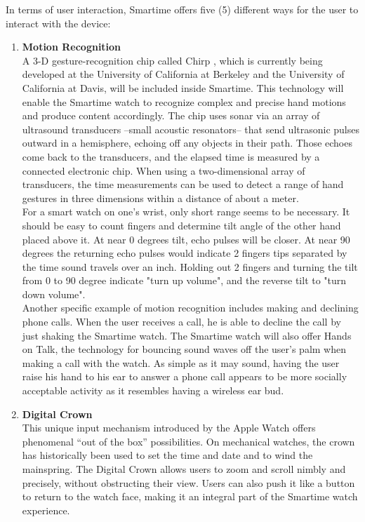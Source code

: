 \documentclass{article}
\begin{document}
In terms of user interaction, Smartime offers five (5) different ways for the user to interact with the device: 

\begin{enumerate}
\item \textbf{Motion Recognition}\\
A 3-D gesture-recognition chip called Chirp , which is currently being developed at the University of California at Berkeley and the University of California at Davis, will be included inside Smartime. This technology will enable the Smartime watch to recognize complex and precise hand motions and produce content accordingly. The chip uses sonar via an array of ultrasound transducers --small acoustic resonators-- that send ultrasonic pulses outward in a hemisphere, echoing off any objects in their path. Those echoes come back to the transducers, and the elapsed time is measured by a connected electronic chip. When using a two-dimensional array of transducers, the time measurements can be used to detect a range of hand gestures in three dimensions within a distance of about a meter.\\ 

For a smart watch on one's wrist, only short range seems to be necessary. It should be easy to count fingers and determine tilt angle of the other hand placed above it. At near 0 degrees tilt, echo pulses will be closer. At near 90 degrees the returning echo pulses  would indicate 2 fingers tips separated by the time sound travels over an inch. Holding out 2 fingers and turning the tilt from 0 to 90 degree indicate "turn up volume", and the reverse tilt to "turn down volume".\\ 

Another specific example of motion recognition includes making and declining phone calls. When the user receives a call, he is able to decline the call by just shaking the Smartime watch. The Smartime watch will also offer Hands on Talk, the technology for bouncing sound waves off the user's palm when making a call with the watch.
As simple as it may sound, having the user raise his hand to his ear to answer a phone call appears to be more socially acceptable activity as it resembles having a wireless ear bud.

\item \textbf{Digital Crown}\\
This unique input mechanism introduced by the Apple Watch offers phenomenal ``out of the box'' possibilities. On mechanical watches, the crown has historically been used to set the time and date and to wind the mainspring. The Digital Crown allows users to zoom and scroll nimbly and precisely, without obstructing their view. Users can also push it like a button to return to the watch face, making it an integral part of the Smartime watch experience. 


\end{enumerate}
\end{document}
